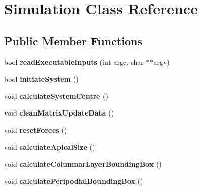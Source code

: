 \hypertarget{classSimulation}{}\section{Simulation Class Reference}
\label{classSimulation}
\subsection*{Public Member Functions}
\begin{DoxyCompactItemize}
\item 
\hypertarget{classSimulation_aa5c031b9d4c6b3d74f636adec0b695ed}{}bool {\bfseries read\+Executable\+Inputs} (int argc, char $\ast$$\ast$argv)\label{classSimulation_aa5c031b9d4c6b3d74f636adec0b695ed}

\item 
\hypertarget{classSimulation_ae44910ca27d6ec5eaa48f7136fad87ea}{}bool {\bfseries initiate\+System} ()\label{classSimulation_ae44910ca27d6ec5eaa48f7136fad87ea}

\item 
\hypertarget{classSimulation_a1f9bf054812136067d30e79345f877de}{}void {\bfseries calculate\+System\+Centre} ()\label{classSimulation_a1f9bf054812136067d30e79345f877de}

\item 
\hypertarget{classSimulation_aa8fb138f6057956ce2b6e02fbcb0254f}{}void {\bfseries clean\+Matrix\+Update\+Data} ()\label{classSimulation_aa8fb138f6057956ce2b6e02fbcb0254f}

\item 
\hypertarget{classSimulation_accaeb0b305b4d779ea3551a810caf99c}{}void {\bfseries reset\+Forces} ()\label{classSimulation_accaeb0b305b4d779ea3551a810caf99c}

\item 
\hypertarget{classSimulation_a8e6ec9457aa61d2493747d0110a50ca5}{}void {\bfseries calculate\+Apical\+Size} ()\label{classSimulation_a8e6ec9457aa61d2493747d0110a50ca5}

\item 
\hypertarget{classSimulation_a7e8ad0106fac230f8c825431b94f61f4}{}void {\bfseries calculate\+Columnar\+Layer\+Bounding\+Box} ()\label{classSimulation_a7e8ad0106fac230f8c825431b94f61f4}

\item 
\hypertarget{classSimulation_adf1ee4bfc51b15dda4c2e89e9fb1ccd9}{}void {\bfseries calculate\+Peripodial\+Bounding\+Box} ()\label{classSimulation_adf1ee4bfc51b15dda4c2e89e9fb1ccd9}


\end{DoxyCompactItemize}
